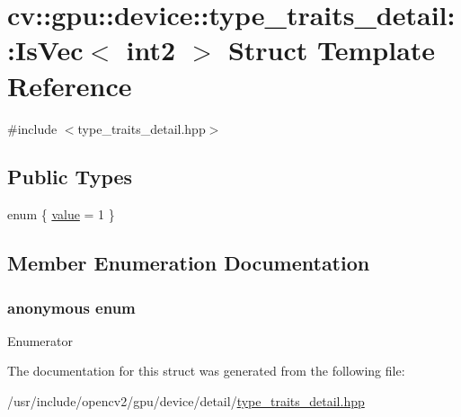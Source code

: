 \hypertarget{structcv_1_1gpu_1_1device_1_1type__traits__detail_1_1IsVec_3_01int2_01_4}{\section{cv\-:\-:gpu\-:\-:device\-:\-:type\-\_\-traits\-\_\-detail\-:\-:Is\-Vec$<$ int2 $>$ Struct Template Reference}
\label{structcv_1_1gpu_1_1device_1_1type__traits__detail_1_1IsVec_3_01int2_01_4}
}


{\ttfamily \#include $<$type\-\_\-traits\-\_\-detail.\-hpp$>$}

\subsection*{Public Types}
\begin{DoxyCompactItemize}
\item 
enum \{ \hyperlink{structcv_1_1gpu_1_1device_1_1type__traits__detail_1_1IsVec_3_01int2_01_4_a73d716fce6fc37b152f71a09949a48c8aa3306743d12fe20d386afec7358e9ff2}{value} = 1
 \}
\end{DoxyCompactItemize}


\subsection{Member Enumeration Documentation}
\hypertarget{structcv_1_1gpu_1_1device_1_1type__traits__detail_1_1IsVec_3_01int2_01_4_a73d716fce6fc37b152f71a09949a48c8}{\subsubsection[{anonymous enum}]{\setlength{\rightskip}{0pt plus 5cm}anonymous enum}}\label{structcv_1_1gpu_1_1device_1_1type__traits__detail_1_1IsVec_3_01int2_01_4_a73d716fce6fc37b152f71a09949a48c8}
\begin{Desc}
\item[Enumerator]\par
\begin{description}
\item[{\em 
\hypertarget{structcv_1_1gpu_1_1device_1_1type__traits__detail_1_1IsVec_3_01int2_01_4_a73d716fce6fc37b152f71a09949a48c8aa3306743d12fe20d386afec7358e9ff2}{value}\label{structcv_1_1gpu_1_1device_1_1type__traits__detail_1_1IsVec_3_01int2_01_4_a73d716fce6fc37b152f71a09949a48c8aa3306743d12fe20d386afec7358e9ff2}
}]\end{description}
\end{Desc}


The documentation for this struct was generated from the following file\-:\begin{DoxyCompactItemize}
\item 
/usr/include/opencv2/gpu/device/detail/\hyperlink{type__traits__detail_8hpp}{type\-\_\-traits\-\_\-detail.\-hpp}\end{DoxyCompactItemize}
